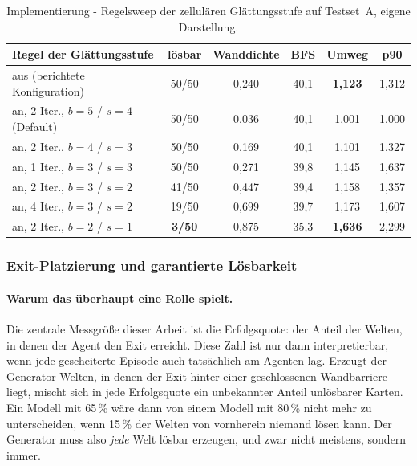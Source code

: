\documentclass[11pt,a4paper]{article}
\begin{document}
\begin{table}[htbp]
\centering
\small
\begin{tabular}{@{}lccccc@{}}
\toprule
\textbf{Regel der Glättungsstufe} & \textbf{lösbar} & \textbf{Wanddichte} &
\textbf{BFS} & \textbf{Umweg} & \textbf{p90} \\
\midrule
aus (berichtete Konfiguration) & 50/50 & 0,240 & 40,1 & \textbf{1,123} & 1,312 \\
\addlinespace
an, 2 Iter., $b{=}5$ / $s{=}4$ (Default) & 50/50 & 0,036 & 40,1 & 1,001 & 1,000 \\
an, 2 Iter., $b{=}4$ / $s{=}3$ & 50/50 & 0,169 & 40,1 & 1,101 & 1,327 \\
an, 1 Iter., $b{=}3$ / $s{=}3$ & 50/50 & 0,271 & 39,8 & 1,145 & 1,637 \\
an, 2 Iter., $b{=}3$ / $s{=}2$ & 41/50 & 0,447 & 39,4 & 1,158 & 1,357 \\
an, 4 Iter., $b{=}3$ / $s{=}2$ & 19/50 & 0,699 & 39,7 & 1,173 & 1,607 \\
an, 2 Iter., $b{=}2$ / $s{=}1$ & \textbf{3/50} & 0,875 & 35,3 & \textbf{1,636} & 2,299 \\
\bottomrule
\end{tabular}
\caption[Regelsweep der zellulären Glättung]{Implementierung - Regelsweep
der zellulären Glättungsstufe auf Testset~A, eigene Darstellung.}
\label{tab:geometrieprobe}
\end{table}

\subsubsection{Exit-Platzierung und garantierte Lösbarkeit}
\label{sec:loesbarkeit}

\paragraph{Warum das überhaupt eine Rolle spielt.} Die zentrale Messgröße
dieser Arbeit ist die Erfolgsquote: der Anteil der Welten, in denen der Agent
den Exit erreicht. Diese Zahl ist nur dann interpretierbar, wenn jede
gescheiterte Episode auch tatsächlich am Agenten lag. Erzeugt der Generator
Welten, in denen der Exit hinter einer geschlossenen Wandbarriere liegt, mischt
sich in jede Erfolgsquote ein unbekannter Anteil unlösbarer Karten. Ein Modell
mit 65\,\% wäre dann von einem Modell mit 80\,\% nicht mehr zu unterscheiden,
wenn 15\,\% der Welten von vornherein niemand lösen kann. Der Generator muss
also \emph{jede} Welt lösbar erzeugen, und zwar nicht \glqq meistens\grqq{},
sondern immer.
\end{document}
